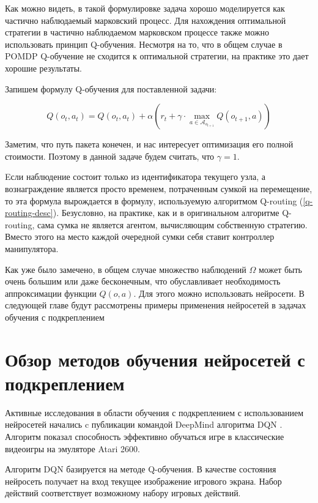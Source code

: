\documentclass[specification,annotation,times]{itmo-student-thesis}
\theoremstyle{definition}
\begin{document}
Как можно видеть, в такой формулировке задача хорошо моделируется как частично
наблюдаемый марковский процесс. Для нахождения оптимальной стратегии в частично
наблюдаемом марковском процессе также можно использовать принцип Q-обучения.
Несмотря на то, что в общем случае в POMDP Q-обучение не сходится к оптимальной
стратегии, на практике это дает хорошие результаты.

Запишем формулу Q-обучения для поставленной задачи:

\begin{equation}
Q(o_t, a_t) = Q(o_t, a_t) + \alpha \left( r_t +
\gamma \cdot \max\limits_{a \in \mathcal{A}_{o_{t+1}}} Q(o_{t+1}, a) \right)
\end{equation}

Заметим, что путь пакета конечен, и нас интересует оптимизация его полной
стоимости. Поэтому в данной задаче будем считать, что $\gamma = 1$.

Eсли наблюдение состоит только из идентификатора текущего
узла, а вознаграждение является просто временем, потраченным сумкой на
перемещение, то эта формула вырождается в формулу, используемую алгоритмом
Q-routing (\ref{q-routing-desc}). Безусловно, на практике, как и в оригинальном
алгоритме Q-routing, сама сумка не является агентом, вычисляющим собственную
стратегию. Вместо этого на место каждой очередной сумки себя ставит контроллер
манипулятора.

Как уже было замечено, в общем случае множество наблюдений $\Omega$ может быть
очень большим или даже бесконечным, что обуславливает необходимость
аппроксимации функции $Q(o, a)$. Для этого можно использовать нейросети. В
следующей главе будут рассмотрены примеры применения нейросетей в задачах
обучения с подкреплением

\section{Обзор методов обучения нейросетей с подкреплением}\label{overview:nns}

Активные исследования в области обучения с подкреплением с использованием
нейросетей начались c публикации командой DeepMind алгоритма
DQN \cite{deepmind-dqn-orig}. Алгоритм показал способность эффективно обучаться
игре в классические видеоигры на эмуляторе Atari 2600. 

Алгоритм DQN базируется на методе Q-обучения. В качестве состояния нейросеть
получает на вход текущее изображение игрового экрана. Набор действий
соответствует возможному набору игровых действий.
\end{document}
